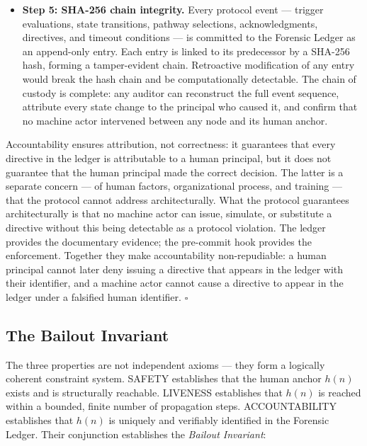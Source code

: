 \begin{itemize}
  \item[$\bullet$] \textbf{Step 5: SHA-256 chain integrity.}
    Every protocol event — trigger evaluations, state transitions, pathway selections,
    acknowledgments, directives, and timeout conditions — is committed to the Forensic
    Ledger as an append-only entry. Each entry is linked to its predecessor by a
    SHA-256 hash, forming a tamper-evident chain. Retroactive modification of any entry
    would break the hash chain and be computationally detectable. The chain of custody
    is complete: any auditor can reconstruct the full event sequence, attribute every
    state change to the principal who caused it, and confirm that no machine actor
    intervened between any node and its human anchor.
\end{itemize}

Accountability ensures attribution, not correctness: it guarantees that every directive
in the ledger is attributable to a human principal, but it does not guarantee that the
human principal made the correct decision. The latter is a separate concern — of
human factors, organizational process, and training — that the protocol cannot address
architecturally. What the protocol guarantees architecturally is that no machine actor
can issue, simulate, or substitute a directive without this being detectable as a
protocol violation. The ledger provides the documentary evidence; the pre-commit hook
provides the enforcement. Together they make accountability non-repudiable: a human
principal cannot later deny issuing a directive that appears in the ledger with their
identifier, and a machine actor cannot cause a directive to appear in the ledger under
a falsified human identifier. $\square$

\subsection{The Bailout Invariant}
\label{sec:bailout-invariant}

The three properties are not independent axioms — they form a logically coherent
constraint system. SAFETY establishes that the human anchor $h(n)$ exists and is
structurally reachable. LIVENESS establishes that $h(n)$ is reached within a bounded,
finite number of propagation steps. ACCOUNTABILITY establishes that $h(n)$ is uniquely
and verifiably identified in the Forensic Ledger. Their conjunction establishes the
\emph{Bailout Invariant}:

